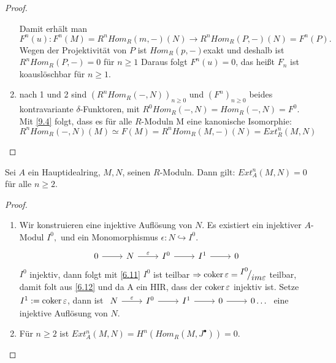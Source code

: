 \begin{proof}
\begin{enumerate}
		Damit erhält man $F^{n}(u): F^{n}(M) = R^{n}Hom_R(m,-)(N) \to R^{n}Hom_R(P,-)(N) = F^{n}(P). $ Wegen der Projektivität von $P$ ist $Hom_R(p,-) $exakt und deshalb ist $R^{n}Hom_R(P,-)= 0 $ für $n \geq 1$ Daraus folgt $F^{n}(u) = 0$, das heißt $F_n $ ist koauslöschbar für $ n \geq 1$. 
		\item nach 1 und 2 sind $(R^{n}Hom_R(-,N))_{n \geq 0} $ und $ (F^{n})_{n \geq 0} $ beides kontravariante $\delta$-Funktoren, mit $ R^{0}Hom_R(-,N) = Hom_R(-,N)= F^{0}. 
		$ Mit \ref{9.4} folgt, dass es für alle $R$-Moduln M eine kanonische Isomorphie: 
		$$R^{n}Hom_R(-,N)(M) \simeq F(M) = R^{n}Hom_R(M,-)(N) = Ext^{n}_R(M,N)$$
	\end{enumerate}
\end{proof}
\begin{sa}\label{10.3}
	Sei $A$ ein Hauptidealring, $M,N$, seinen $R$-Moduln. Dann gilt: $Ext^{n}_A(M,N) =0 $
	 für alle $ n \geq 2$.
\end{sa}
\begin{proof}
	\begin{enumerate}
		\item Wir konstruieren eine injektive Auflösung von $N$. Es existiert ein injektiver $A$-Modul $I^{0}, $ und ein Monomorphismus $\epsilon: N \hookrightarrow I^{0}.$ 
		$$\begin{tikzcd}
		0\arrow{r} & N \arrow{r}{\epsilon} & I^{0} \arrow{r} & I^1 \arrow{r} & 0 
		\end{tikzcd}$$
		$I^{0} $ injektiv, dann folgt mit \ref{6.11} $I^{0} $ ist teilbar $\Ra \coker \epsilon = \QR{I^0}{im \epsilon } $ teilbar, damit folt aus \ref{6.12} und da A ein HIR, dass der $\operatorname{coker} \varepsilon $ injektiv ist.  Setze $I^1 := \operatorname{coker} \varepsilon$, dann ist $\begin{tikzcd}
		N \arrow{r}{\epsilon} & I^{0} \arrow{r} & I^1 \arrow{r} & 0 \arrow{r}  & 0 \dots
		\end{tikzcd}$ eine injektive Auflösung von $N$. 
		\item Für $n \geq 2 $ ist $ Ext^{n}_A(M,N) = H^{n}(Hom_R(M,J^{\bullet})) = 0.$
		
	\end{enumerate}
\end{proof}
